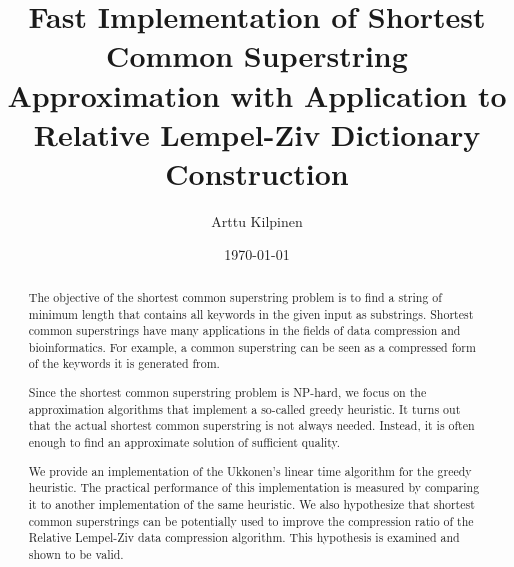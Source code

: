 \documentclass[english,twoside,censored,csm,algorithms-track-2020]{HYthesisML}
\title{Fast Implementation of Shortest Common Superstring Approximation with Application to Relative Lempel-Ziv Dictionary Construction}
\author{Arttu Kilpinen}
\date{\today}
\theoremstyle{plain}
\theoremstyle{definition}
\begin{document}
\maketitle



\begin{abstract}

  The objective of the shortest common superstring problem is to find a string of
  minimum length that contains all keywords in the given input as substrings.
  Shortest common superstrings have many applications in the fields of
  data compression and bioinformatics. For example, a common superstring can be seen as a
  compressed form of the keywords it is generated from.

  
  Since the shortest common superstring problem is NP-hard,
  we focus on the approximation algorithms that implement a so-called greedy
  heuristic. It turns out that the actual shortest common superstring
  is not always needed. Instead, it is often enough to find an
  approximate solution of sufficient quality. 

  We provide an implementation of the Ukkonen's linear time algorithm for the
  greedy heuristic. The practical performance of this implementation is measured by
  comparing it to another implementation of the same heuristic.
  We also hypothesize that shortest common superstrings can be potentially used
  to improve the compression ratio of the Relative Lempel-Ziv data compression algorithm.
  This hypothesis is examined and shown to be valid.
  
\end{abstract}

\newpage

\mytableofcontents

\end{document}
